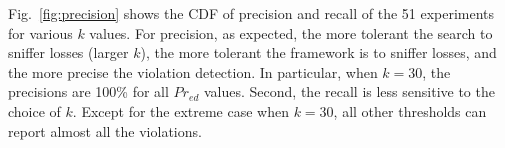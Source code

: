 Fig.~\ref{fig:precision} shows the CDF of precision and recall of the 51
experiments for various $k$ values. For precision, as expected, the more
tolerant the search to sniffer losses (larger $k$), the more tolerant the
framework is to sniffer losses, and the more precise the violation detection. In
particular, when $k=30$, the precisions are 100\% for all $Pr_{ed}$ values.
Second, the recall is less sensitive to the choice of $k$.  Except for the
extreme case when $k=30$, all other thresholds can report almost all the
violations.
